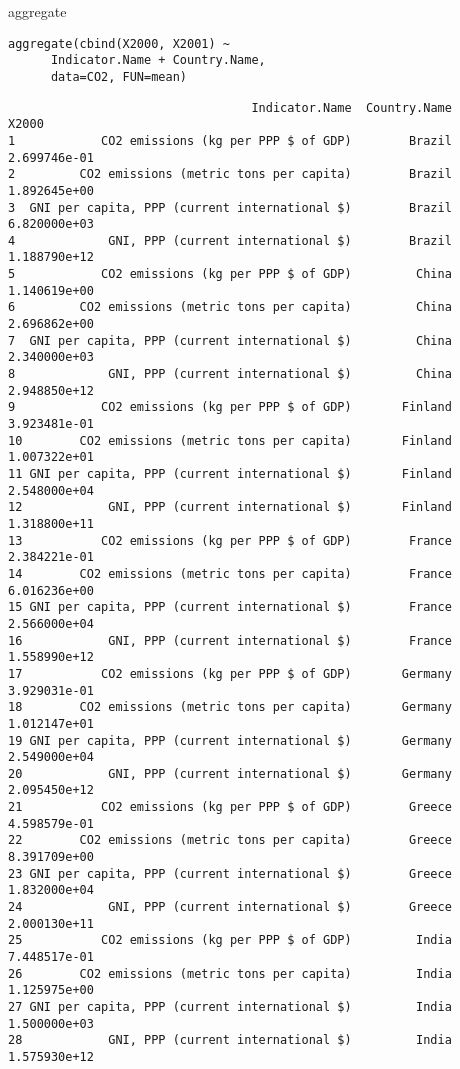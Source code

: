 \documentclass[xcolor={usenames,svgnames,dvipsnames}]{beamer}
\begin{document}
\begin{frame}[fragile,label=sec-3-7]{aggregate}
 \lstset{language=R,numbers=none}
\begin{lstlisting}
aggregate(cbind(X2000, X2001) ~
	  Indicator.Name + Country.Name,
	  data=CO2, FUN=mean)
\end{lstlisting}

\begin{verbatim}
                                  Indicator.Name  Country.Name        X2000
1            CO2 emissions (kg per PPP $ of GDP)        Brazil 2.699746e-01
2         CO2 emissions (metric tons per capita)        Brazil 1.892645e+00
3  GNI per capita, PPP (current international $)        Brazil 6.820000e+03
4             GNI, PPP (current international $)        Brazil 1.188790e+12
5            CO2 emissions (kg per PPP $ of GDP)         China 1.140619e+00
6         CO2 emissions (metric tons per capita)         China 2.696862e+00
7  GNI per capita, PPP (current international $)         China 2.340000e+03
8             GNI, PPP (current international $)         China 2.948850e+12
9            CO2 emissions (kg per PPP $ of GDP)       Finland 3.923481e-01
10        CO2 emissions (metric tons per capita)       Finland 1.007322e+01
11 GNI per capita, PPP (current international $)       Finland 2.548000e+04
12            GNI, PPP (current international $)       Finland 1.318800e+11
13           CO2 emissions (kg per PPP $ of GDP)        France 2.384221e-01
14        CO2 emissions (metric tons per capita)        France 6.016236e+00
15 GNI per capita, PPP (current international $)        France 2.566000e+04
16            GNI, PPP (current international $)        France 1.558990e+12
17           CO2 emissions (kg per PPP $ of GDP)       Germany 3.929031e-01
18        CO2 emissions (metric tons per capita)       Germany 1.012147e+01
19 GNI per capita, PPP (current international $)       Germany 2.549000e+04
20            GNI, PPP (current international $)       Germany 2.095450e+12
21           CO2 emissions (kg per PPP $ of GDP)        Greece 4.598579e-01
22        CO2 emissions (metric tons per capita)        Greece 8.391709e+00
23 GNI per capita, PPP (current international $)        Greece 1.832000e+04
24            GNI, PPP (current international $)        Greece 2.000130e+11
25           CO2 emissions (kg per PPP $ of GDP)         India 7.448517e-01
26        CO2 emissions (metric tons per capita)         India 1.125975e+00
27 GNI per capita, PPP (current international $)         India 1.500000e+03
28            GNI, PPP (current international $)         India 1.575930e+12

\end{verbatim}
\end{frame}
\end{document}
